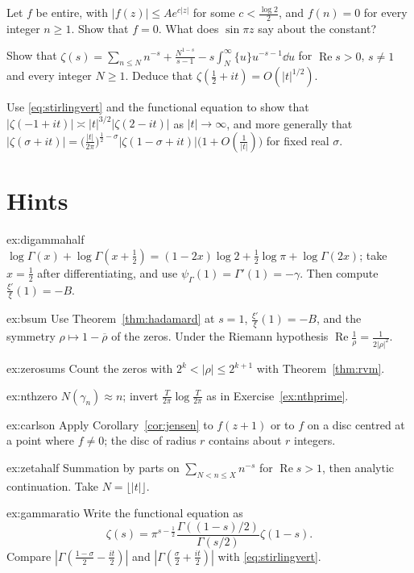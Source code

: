 \begin{exercise}[$\star\star$]\label{ex:carlson}
Let $f$ be entire, with $|f(z)|\le Ae^{c|z|}$ for some $c<\frac{\log2}2$, and $f(n)=0$ for every integer $n\ge1$. Show that $f=0$. What does $\sin\pi z$ say about the constant?
\end{exercise}

\begin{exercise}[$\star\star$]\label{ex:zetahalf}
Show that $\zeta(s)=\sum_{n\le N}n^{-s}+\frac{N^{1-s}}{s-1}-s\int_N^\infty\{u\}u^{-s-1}\dd u$ for $\operatorname{Re}s>0$, $s\ne1$ and every integer $N\ge1$. Deduce that $\zeta(\frac12+it)=O(|t|^{1/2})$.
\end{exercise}

\begin{exercise}[$\star\star\star$]\label{ex:gammaratio}
Use \eqref{eq:stirlingvert} and the functional equation to show that $|\zeta(-1+it)|\asymp|t|^{3/2}|\zeta(2-it)|$ as $|t|\to\infty$, and more generally that
$|\zeta(\sigma+it)|=\bigl(\frac{|t|}{2\pi}\bigr)^{\frac12-\sigma}|\zeta(1-\sigma+it)|\bigl(1+O(\frac1{|t|})\bigr)$ for fixed real $\sigma$.
\end{exercise}

\section{Hints}

\begin{hint}{ex:digammahalf}
$\log\Gamma(x)+\log\Gamma(x+\frac12)=(1-2x)\log2+\frac12\log\pi+\log\Gamma(2x)$; take $x=\frac12$ after differentiating, and use $\psi_\Gamma(1)=\Gamma'(1)=-\gamma$. Then compute $\frac{\xi'}\xi(1)=-B$.
\end{hint}
\begin{hint}{ex:bsum}
Use Theorem~\ref{thm:hadamard} at $s=1$, $\frac{\xi'}\xi(1)=-B$, and the symmetry $\rho\mapsto1-\overline\rho$ of the zeros. Under the Riemann hypothesis $\operatorname{Re}\frac1\rho=\frac1{2|\rho|^2}$.
\end{hint}
\begin{hint}{ex:zerosums}
Count the zeros with $2^k<|\rho|\le2^{k+1}$ with Theorem~\ref{thm:rvm}.
\end{hint}
\begin{hint}{ex:nthzero}
$N(\gamma_n)\approx n$; invert $\frac T{2\pi}\log\frac T{2\pi}$ as in Exercise~\ref{ex:nthprime}.
\end{hint}
\begin{hint}{ex:carlson}
Apply Corollary~\ref{cor:jensen} to $f(z+1)$ or to $f$ on a disc centred at a point where $f\ne0$; the disc of radius $r$ contains about $r$ integers.
\end{hint}
\begin{hint}{ex:zetahalf}
Summation by parts on $\sum_{N<n\le X}n^{-s}$ for $\operatorname{Re}s>1$, then analytic continuation. Take $N=\lfloor|t|\rfloor$.
\end{hint}
\begin{hint}{ex:gammaratio}
Write the functional equation as
\[\zeta(s)=\pi^{s-\frac12}\frac{\Gamma((1-s)/2)}{\Gamma(s/2)}\zeta(1-s).\]
Compare $|\Gamma(\frac{1-\sigma}2-\frac{it}2)|$ and $|\Gamma(\frac\sigma2+\frac{it}2)|$ with \eqref{eq:stirlingvert}.
\end{hint}

